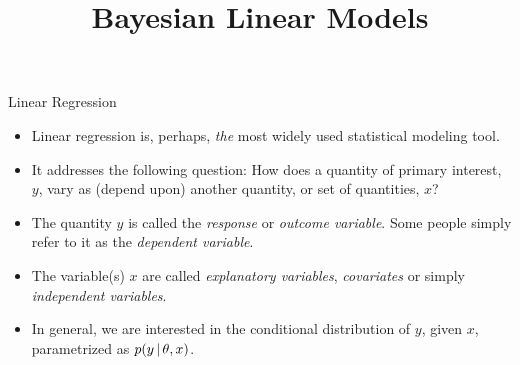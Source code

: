 



\title[]{Bayesian Linear Models}




\maketitle


\begin{frame}{Linear Regression}

\begin{itemize}\setlength{\itemsep}{0.5cm}
\item Linear regression is, perhaps, \emph{the} most widely used statistical modeling tool.

\item It addresses the following question: How does a quantity of primary interest, $y$, vary as (depend upon) another quantity, or set of quantities, $x$?  

\item The quantity $y$ is called the \emph{response} or \emph{outcome variable}. Some people simply refer to it as the \emph{dependent variable}.

\item The variable(s) $x$ are called \emph{explanatory variables}, \emph{covariates} or simply \emph{independent variables}.

\item In general, we are interested in the conditional distribution of $y$, given $x$, parametrized as $p(y\,|\, \theta, x)$.
\end{itemize}

\end{frame}

